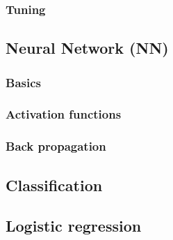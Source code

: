     \subsubsection{Tuning}\label{sec:tuning}

\subsection{Neural Network (NN)}\label{sec:neural_network}

    \subsubsection{Basics}\label{sec:basics}

    \subsubsection{Activation functions}\label{sec:activation_function}

    \subsubsection{Back propagation}\label{sec:back_propagation}

\subsection{Classification}\label{sec:classification}

\subsection{Logistic regression}\label{sec:logistic_regression}

